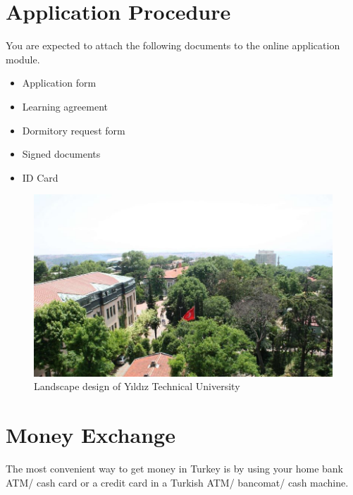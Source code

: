 \section{Application Procedure}
You are expected to attach the following documents to the online application module.

\begin{itemize}
\item Application form
\item Learning agreement
\item Dormitory request form 
\item Signed documents
\item ID Card
\end{itemize}

\begin{figure}[!htbp]
\centering
\includegraphics[width=\textwidth]{projectChapters/images/Picture1.png}
\caption{Landscape design of Yıldız Technical University}
\label{fig:ornek4}
\end{figure}

\section{Money Exchange}
The most convenient way to get money  in Turkey is by using your home bank ATM/ cash card or a credit card in a Turkish ATM/ bancomat/ cash machine.

